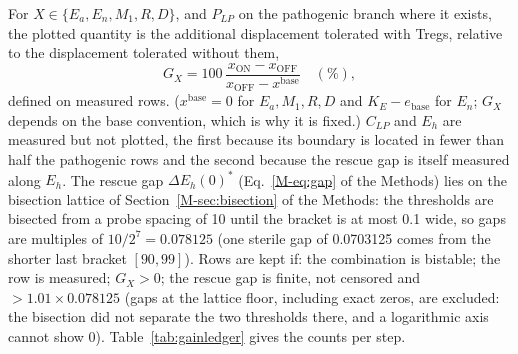 \documentclass[11pt]{article}
\newcommand{\gap}{\Delta E_h(0)^{*}}
\begin{document}
For $X \in \{E_a, E_n, M_1, R, D\}$, and $P_{LP}$ on the pathogenic branch where it exists,
the plotted quantity is the additional displacement
tolerated with Tregs, relative to the displacement tolerated without them,
\begin{equation}
  G_X = 100\,\frac{x_{\mathrm{ON}} - x_{\mathrm{OFF}}}{x_{\mathrm{OFF}} - x^{\mathrm{base}}}\quad(\%),
  \label{eq:GX}
\end{equation}
defined on measured rows. ($x^{\mathrm{base}} = 0$ for $E_a, M_1, R, D$ and $K_E - e_{\mathrm{base}}$ for
$E_n$; $G_X$ depends on the base convention, which is why it is fixed.) $C_{LP}$ and $E_h$ are measured but not plotted, the first because its boundary is
located in fewer than half the pathogenic rows and the second because the rescue gap is itself
measured along $E_h$. The rescue gap $\gap$ (Eq.~\ref{M-eq:gap} of the Methods) lies on the
bisection lattice of Section~\ref{M-sec:bisection} of the Methods: the thresholds are bisected from a probe
spacing of 10 until the bracket is at most 0.1 wide, so gaps are multiples of
$10/2^7 = 0.078125$ (one sterile gap of 0.0703125 comes from the shorter last bracket
$[90, 99]$). Rows are kept if: the combination is bistable; the row is measured;
$G_X > 0$; the rescue gap is finite, not censored and $> 1.01\times0.078125$ (gaps at the
lattice floor, including exact zeros, are excluded: the bisection did not separate the two
thresholds there, and a logarithmic axis cannot show 0). Table~\ref{tab:gainledger} gives the
counts per step.
\end{document}
